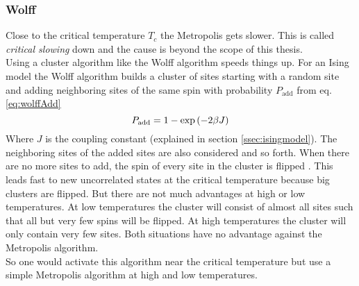     \subsubsection{Wolff}
    \label{sssec:wolff}
        Close to the critical temperature \(T_c\) the Metropolis
        gets slower. This is called \emph{critical slowing} down and the
        cause is beyond the scope of this thesis.\\
        Using a cluster algorithm like the Wolff
        algorithm \cite{Wolff1989} speeds things up.
        For an Ising model the Wolff algorithm builds a cluster of sites
        starting with a random site and adding neighboring sites of the
        same spin with probability \(P_{\mathrm{add}}\) from eq. \eqref{eq:wolffAdd}
        \begin{equation}
            P_{\mathrm{add}} = 1-\exp\left(-2\beta J\right)
            \label{eq:wolffAdd}
        \end{equation}
        Where \(J\) is the coupling constant (explained in section
        \ref{ssec:isingmodel}). The neighboring sites of the added sites
        are also considered and so forth. When there are no more sites
        to add, the spin of every site in the cluster is flipped
        \cite[S. ??]{NewmanBarkema1999} \cite[S. 151f]{Katzgraber2011}.
        This leads fast to new uncorrelated states at the critical
        temperature because big clusters are flipped. But there are not
        much advantages at high or low temperatures. At low temperatures
        the cluster will consist of almost all sites such that all but
        very few spins will be flipped. At high temperatures the cluster
        will only contain very few sites.
        Both situations have no advantage against the Metropolis algorithm.\\
        So one would activate this algorithm near the critical temperature
        but use a simple Metropolis algorithm at high and low temperatures.


